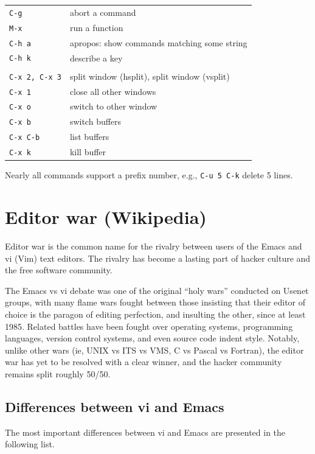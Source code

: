 \documentclass[10pt,twoside,openright]{memoir}
\begin{document}
{\begin{tabular}{ll}
\texttt{C-g} & abort a command \\
\texttt{M-x} & run a function \\
\texttt{C-h a} & apropos: show commands matching some string \\
\texttt{C-h k} & describe a key \\
& \\
\texttt{C-x 2, C-x 3} & split window (hsplit), split window (vsplit) \\
\texttt{C-x 1} & close all other windows \\
\texttt{C-x o} & switch to other window \\
\texttt{C-x b} & switch buffers \\
\texttt{C-x C-b} & list buffers \\
\texttt{C-x k} & kill buffer \\
\end{tabular}

\vskip 0.1in
\noindent
Nearly all commands support a prefix number, e.g., \texttt{C-u 5 C-k} delete 5 lines.
}



\chapter{Editor war (Wikipedia)}

Editor war is the common name for the rivalry between users of the Emacs and vi (Vim) text editors. The rivalry has become a lasting part of hacker culture and the free software community.

The Emacs vs vi debate was one of the original ``holy wars'' conducted on Usenet groups, with many flame wars fought between those insisting that their editor of choice is the paragon of editing perfection, and insulting the other, since at least 1985. Related battles have been fought over operating systems, programming languages, version control systems, and even source code indent style. Notably, unlike other wars (ie, UNIX vs ITS vs VMS, C vs Pascal vs Fortran), the editor war has yet to be resolved with a clear winner, and the hacker community remains split roughly 50/50.

\section{Differences between vi and Emacs}

The most important differences between vi and Emacs are presented in the following list.
\end{document}
